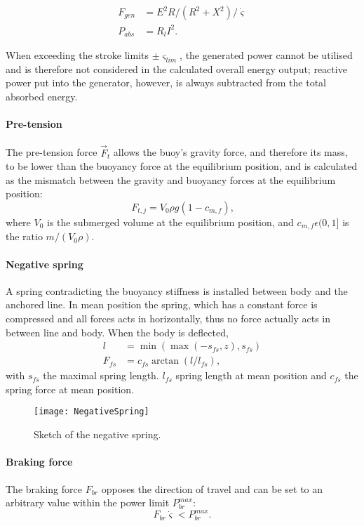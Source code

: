 \documentclass[oneside,10pt,a4paper]{book}
\begin{document}
\begin{align}
	F_{gen}&=E^2 R/(R^2+X^2)/\dot{\varsigma}\\
	P_{abs}&=R_l I^2.
\end{align}

When exceeding the stroke limits $\pm \varsigma_{lim}$, the generated power cannot be utilised and is therefore not considered in the calculated overall energy output; reactive power put into the generator, however, is always subtracted from the total absorbed energy.
\paragraph{Pre-tension}
The pre-tension force $\vec{F}_{t}$ allows the buoy's gravity force, and therefore its mass, to be lower than the buoyancy force at the equilibrium position, and is calculated as the mismatch between the gravity and buoyancy forces at the equilibrium position:
\begin{equation}
	F_{t,j}=V_0 \rho g (1-c_{m,f})\text{,}
\end{equation}
where $V_0$ is the submerged volume at the equilibrium position, and $c_{m,f}\epsilon(0,1]$ is the ratio $m/(V_0\rho)$.
\paragraph{Negative spring}
A spring contradicting the buoyancy stiffness is installed between body and the anchored line. In mean position the spring, which has a constant force is compressed and all forces acts in horizontally, thus no force actually acts in between line and body. When the body is deflected, 
\begin{equation}
	\begin{split}
		l&=\min(\max(-s_{fs},z),s_{fs})\\
		F_{fs}&=c_{fs} \arctan(l/l_{fs})\text{,}
	\end{split}
\end{equation}
with $s_{fs}$ the maximal spring length. $l_{fs}$ spring length at mean position and $c_{fs}$ the spring force at mean position.
\begin{figure*}
	\centering
	\texttt{[image: NegativeSpring]}
	\caption{Sketch of the negative spring.}
	\label{fig:nspring}
\end{figure*}
\paragraph{Braking force}
The braking force $F_{br}$ opposes the direction of travel and can be set to an arbitrary value within the power limit $P_{br}^{max}$:
\begin{equation}
	F_{br}\dot{\varsigma}<P_{br}^{max}\text{.}
\end{equation}
\end{document}
